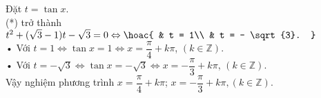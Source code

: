 \begin{vd}
{\begin{listEX}[2]
			Đặt $t = \tan x$.\\
			(*) trở thành $ t^2 + (\sqrt{3}  - 1)t - \sqrt{3}  = 0 \Leftrightarrow \hoac{
				& t = 1\\
				& t =  - \sqrt{3}.
			}$ \\
			• Với $t=1\Leftrightarrow \tan x=1\Leftrightarrow x=\dfrac{\pi}{4}+k\pi$, $( k\in \mathbb{Z})$.\\
			• Với $t=-\sqrt{3}\Leftrightarrow 
			\tan x=-\sqrt{3}\Leftrightarrow x=-\dfrac{\pi}{3}+k\pi$, 
			$( k\in \mathbb{Z} )$. \\
			Vậy nghiệm phương trình  $x=\dfrac{\pi}{4}+k\pi $; $x=-\dfrac{\pi}{3}+k\pi,( k\in \mathbb{Z}).$ 
		\end{listEX}
	}
\end{vd}
